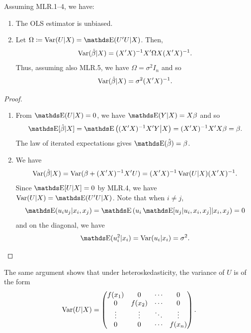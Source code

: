 \documentclass[letterpaper, 10pt]{article}
\begin{document}
\begin{proposition}
  Assuming MLR.1--4, we have:
  \begin{enumerate}[label=(\roman*)]
    \item The OLS estimator is unbiased.
    \item Let \(\Omega \coloneqq \Var(U|X) = \E(U'U|X)\).
      Then,
      \[
        \operatorname{Var}(\hat{\beta} | X) = (X'X)^{-1} X' \Omega X (X'X)^{-1}.
      \]
      Thus, assuming also MLR.5, we have \(\Omega = \sigma^2 I_n\) and so
      \[
        \operatorname{Var}(\hat{\beta} | X) = \sigma^2 (X'X)^{-1}.
      \]
  \end{enumerate}
\end{proposition}
\begin{proof}~
\begin{enumerate}[label=(\roman*)]
  \item From \(\E(U|X) = 0\), we have \(\E(Y|X) = X \beta\) and so
    \[
      \E[\hat{\beta}|X]
      = \E\left( (X'X)^{-1} X'Y \middle| X \right)
      = (X'X)^{-1} X'X \beta
      = \beta.
    \]
    The law of iterated expectations gives \(\E(\hat{\beta}) = \beta\).
  \item We have
    \[
      \operatorname{Var}(\hat{\beta}|X)
      = \operatorname{Var}(\beta + (X'X)^{-1} X'U)
      = (X'X)^{-1} \operatorname{Var}(U|X) (X'X)^{-1}.
    \]
    Since \(\E[U|X] = 0\) by MLR.4, we have  \(\Var(U|X) = \E(U'U|X)\).
    Note that when \(i \neq j\),
    \[
      \E(u_i u_j | x_i, x_j)
      = \E\left( u_i \E[u_j| u_i, x_i, x_j] | x_i, x_j \right)
      = 0
    \]
    and on the diagonal, we have
    \[
      \E(u_i^2 | x_i)
      = \Var(u_i | x_i)
      = \sigma^2.
    \]
\end{enumerate}
\end{proof}
\begin{remark}
  The same argument shows that under heteroskedasticity, the variance of \(U\) is of the form
  \[
    \operatorname{Var}(U|X) = \begin{pmatrix}
      f(x_1) & 0 & \cdots & 0 \\
      0 & f(x_2) & \cdots & 0 \\
      \vdots & \vdots & \ddots & \vdots \\
      0 & 0 & \cdots & f(x_n)
    \end{pmatrix}.
  \]
\end{remark}
\end{document}
